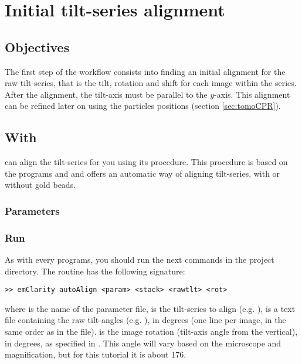 
\section{Initial tilt-series alignment} \label{sec:tilt_series_alignment}

\subsection{Objectives}

The first step of the workflow consists into finding an initial alignment for the raw tilt-series, that is the tilt, rotation and shift for each image within the series. After the alignment, the tilt-axis must be parallel to the $y$-axis. This alignment can be refined later on using the particles positions (section \ref{sec:tomoCPR}).


\subsection{With {\emClarity}} \label{sec:tilt_series_alignment:emClarity}

{\emClarity} can align the tilt-series for you using its  procedure. This procedure is based on the {\IMOD} programs {\tilt} and {\tiltalign} and offers an automatic way of aligning tilt-series, with or without gold beads.


\subsubsection{Parameters}




\subsubsection{Run}

As with every {\emClarity} programs, you should run the next commands in the project directory. The  routine has the following signature:
\begin{lstlisting}
>> emClarity autoAlign <param> <stack> <rawtlt> <rot>
\end{lstlisting}
where  is the name of the parameter file,  is the tilt-series to align (e.g. ),  is a text file containing the raw tilt-angles (e.g. ), in degrees (one line per image, in the same order as in the  file).  is the image rotation (tilt-axis angle from the vertical), in degrees, as specified in {\ETomo}. This angle will vary based on the microscope and magnification, but for this tutorial it is about 176\textdegree.

